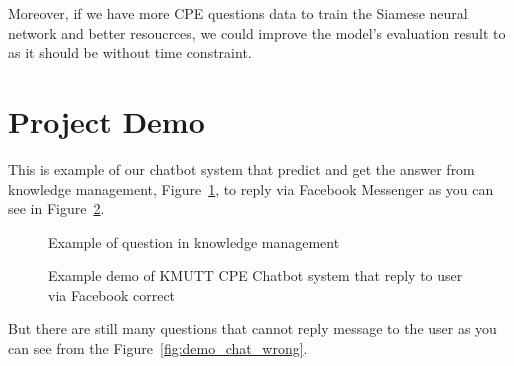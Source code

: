 \documentclass[12pt,oneside,openright,a4paper]{cpe-english-project}
\begin{document}
Moreover, if we have more CPE questions data to train the Siamese neural network and better resoucrces, we could improve the model's evaluation result to as it should be without time constraint.

\pagebreak
\section{Project Demo}
\label{ch4_project_demo}

This is example of our chatbot system that predict and get the answer
from knowledge management, Figure~\ref*{fig:km_question_example},
to reply via Facebook Messenger as you can see in Figure~\ref*{fig:demo_chat_correct}.

\begin{figure}[!h]\centering
{}
\caption{Example of question in knowledge management}\label{fig:km_question_example}
\end{figure}

\begin{figure}[!h]\centering
{}
\caption{Example demo of KMUTT CPE Chatbot system that reply to user via Facebook correct}
\label{fig:demo_chat_correct}
\end{figure}

But there are still many questions that cannot reply message to the user
as you can see from the Figure~\ref*{fig:demo_chat_wrong}.
\end{document}
